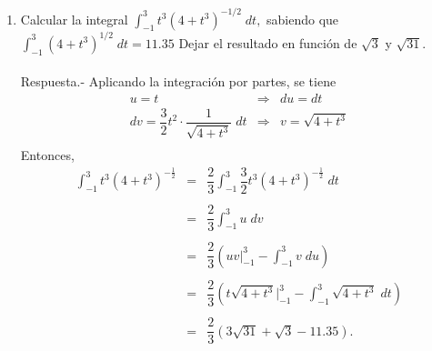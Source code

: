 \begin{enumerate}[\bfseries 1.]
    \item Calcular la integral $\int_{-1}^3 t^3\left(4+t^3\right)^{-1/2}\; dt,$ sabiendo que $\int_{-1}^3 \left(4+t^3\right)^{1/2}\; dt = 11.35$ Dejar el resultado en función de $\sqrt{3}$ y $\sqrt{31}$.\\\\
	Respuesta.- Aplicando la integración por partes, se tiene
	$$
	\begin{array}{rcl}
	    u=t &\Rightarrow& du=dt \\
	    dv=\dfrac{3}{2}t^2\cdot \dfrac{1}{\sqrt{4+t^3}}\; dt &\Rightarrow& v = \sqrt{4+t^3}\\
	\end{array}
	$$
	Entonces, 
	$$
	\begin{array}{rcl}
	    \displaystyle\int_{-1}^3 t^3 \left(4+t^3\right)^{-\frac{1}{2}} &=& \dfrac{2}{3}\displaystyle\int_{-1}^3 \dfrac{3}{2}t^3 \left(4+t^3\right)^{-\frac{1}{2}}\; dt\\\\
	    &=& \dfrac{2}{3} \displaystyle\int_{-1}^3 u\; dv\\\\
	    &=& \dfrac{2}{3}\left(uv\bigg|_{-1}^3 - \displaystyle\int_{-1}^3 v\; du\right)\\\\
	    &=& \dfrac{2}{3}\left(t\sqrt{4+t^3}\bigg|_{-1}^3-\displaystyle\int_{-1}^3 \sqrt{4+t^3}\; dt\right)\\\\
	    &=& \dfrac{2}{3}\left(3\sqrt{31}+\sqrt{3}-11.35\right).
	\end{array}
	$$
	\vspace{.5cm}



\end{enumerate}

